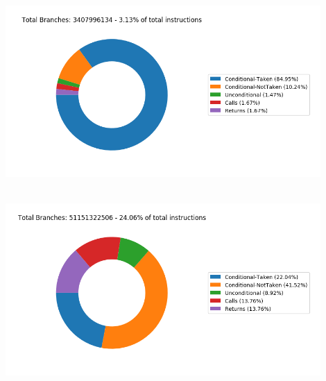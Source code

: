    \begin{minipage}{\textwidth}
      \begin{center}
         \\
         \vspace{3mm}
         \includegraphics[width=0.9\textwidth, frame]{./graphs/4-1/459-GemsFDTD.png}
         \vspace{6mm}
      \end{center}
   \end{minipage}

   \begin{minipage}{\textwidth}
      \begin{center}
         \\
         \vspace{3mm}
         \includegraphics[width=0.9\textwidth, frame]{./graphs/4-1/471-omnetpp.png}
         \vspace{6mm}
      \end{center}
   \end{minipage}

